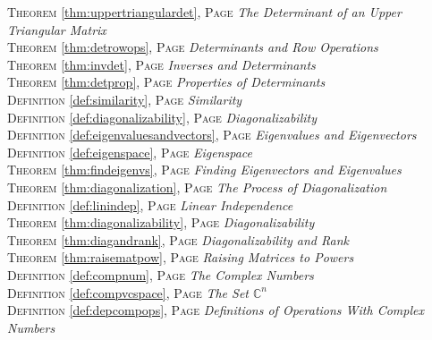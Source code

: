 \begin{multicols}{2}
{\textsc{Theorem} \ref{thm:uppertriangulardet}, \textsc{Page} \pageref{thm:uppertriangulardet} \textit{The Determinant of an Upper Triangular Matrix} \\
\textsc{Theorem} \ref{thm:detrowops}, \textsc{Page} \pageref{thm:detrowops} \textit{Determinants and Row Operations} \\
\textsc{Theorem} \ref{thm:invdet}, \textsc{Page} \pageref{thm:invdet} \textit{Inverses and Determinants} \\
\textsc{Theorem} \ref{thm:detprop}, \textsc{Page} \pageref{thm:detprop} \textit{Properties of Determinants} \\
\textsc{Definition} \ref{def:similarity}, \textsc{Page} \pageref{def:similarity} \textit{Similarity} \\
\textsc{Definition} \ref{def:diagonalizability}, \textsc{Page} \pageref{def:diagonalizability} \textit{Diagonalizability} \\
\textsc{Definition} \ref{def:eigenvaluesandvectors}, \textsc{Page} \pageref{def:eigenvaluesandvectors} \textit{Eigenvalues and Eigenvectors} \\
\textsc{Definition} \ref{def:eigenspace}, \textsc{Page} \pageref{def:eigenspace} \textit{Eigenspace} \\
\textsc{Theorem} \ref{thm:findeigenvs}, \textsc{Page} \pageref{thm:findeigenvs} \textit{Finding Eigenvectors and Eigenvalues} \\
\textsc{Theorem} \ref{thm:diagonalization}, \textsc{Page} \pageref{thm:diagonalization} \textit{The Process of Diagonalization} \\
\textsc{Definition} \ref{def:linindep}, \textsc{Page} \pageref{def:linindep} \textit{Linear Independence} \\
\textsc{Theorem} \ref{thm:diagonalizability}, \textsc{Page} \pageref{thm:diagonalizability} \textit{Diagonalizability} \\
\textsc{Theorem} \ref{thm:diagandrank}, \textsc{Page} \pageref{thm:diagandrank} \textit{Diagonalizability and Rank} \\
\textsc{Theorem} \ref{thm:raisematpow}, \textsc{Page} \pageref{thm:raisematpow} \textit{Raising Matrices to Powers} \\
\textsc{Definition} \ref{def:compnum}, \textsc{Page} \pageref{def:compnum} \textit{The Complex Numbers} \\
\textsc{Definition} \ref{def:compvcspace}, \textsc{Page} \pageref{def:compvcspace} \textit{The Set \(\mathbb {C}^n\)} \\
\textsc{Definition} \ref{def:depcompops}, \textsc{Page} \pageref{def:depcompops} \textit{Definitions of Operations With Complex Numbers} \\
}
\end{multicols}
